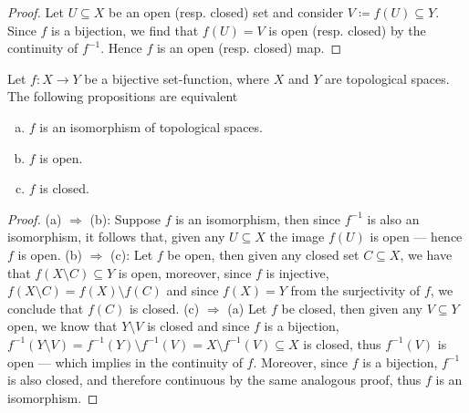 \begin{proof}
    Let \(U \subseteq X\) be an open (resp. closed) set and consider \(V \coloneq f(U)
    \subseteq Y\).  Since \(f\) is a bijection, we find that \(f(U) = V\) is open
    (resp. closed) by the continuity of \(f^{-1}\). Hence \(f\) is an open (resp.
    closed) map.
\end{proof}

\begin{corollary}\label{cor:bij-iso-open-closed}
    Let \(f: X \to Y\) be a bijective set-function, where \(X\) and \(Y\) are
    topological spaces. The following propositions are equivalent
    \begin{enumerate}[(a)]\setlength\itemsep{0em}
        \item \(f\) is an isomorphism of topological spaces.
        \item \(f\) is open.
        \item \(f\) is closed.
    \end{enumerate}
\end{corollary}

\begin{proof}
    (a) \(\Rightarrow\) (b): Suppose \(f\) is an isomorphism, then since \(f^{-1}\)
    is also an isomorphism, it follows that, given any \(U \subseteq X\) the image
    \(f(U)\) is open --- hence \(f\) is open. (b) \(\Rightarrow\) (c): Let \(f\) be
    open, then given any closed set \(C \subseteq X\), we have that \(f(X \setminus
    C) \subseteq Y\) is open, moreover, since \(f\) is injective, \(f(X \setminus C)
    = f(X) \setminus f(C)\) and since \(f(X) = Y\) from the surjectivity of \(f\),
    we conclude that \(f(C)\) is closed. (c) \(\Rightarrow\) (a) Let \(f\) be
    closed, then given any \(V \subseteq Y\) open, we know that \(Y \setminus V\) is
    closed and since \(f\) is a bijection, \(f^{-1}(Y \setminus V) = f^{-1}(Y)
    \setminus f^{-1}(V) = X \setminus f^{-1}(V) \subseteq X\) is closed, thus
    \(f^{-1}(V)\) is open --- which implies in the continuity of \(f\). Moreover,
    since \(f\) is a bijection, \(f^{-1}\) is also closed, and therefore continuous
    by the same analogous proof, thus \(f\) is an isomorphism.
\end{proof}

